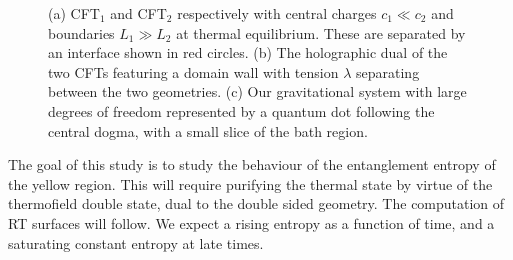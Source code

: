 \begin{figure}
\begin{subfigure}[b]{0.3\textwidth}
         \caption{}
         \label{QM 2}
     \end{subfigure}
     \hfill
     \begin{subfigure}[b]{0.3\textwidth}
         \centering
         \caption{}
         \label{QM 3}
     \end{subfigure}
     \hfill
    \caption{(a) CFT$_1$  and CFT$_2$ respectively with central charges $c_1\ll c_2$ and boundaries $L_1\gg L_2$ at thermal equilibrium. These are separated by an interface shown in red circles. (b) The holographic dual of the two CFTs featuring a domain wall with tension $\lambda$ separating between the two geometries. (c) Our gravitational system with large degrees of freedom represented by a quantum dot following the central dogma, with a small slice of the bath region.}
    \label{QM fig}
\end{figure}

The goal of this study is to study the behaviour of the entanglement entropy of the yellow region. This will require purifying the thermal state by virtue of the thermofield double state, dual to the double sided  geometry\cite{ISRAEL1976107}. The computation of  RT surfaces will follow. We expect a rising entropy as a function of time, and a saturating constant entropy at late times.

